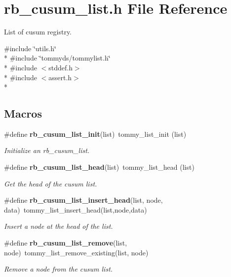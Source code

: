 \section{rb\+\_\+cusum\+\_\+list.\+h File Reference}
\label{rb__cusum__list_8h}


List of cusum registry.  


{\ttfamily \#include \char`\"{}utils.\+h\char`\"{}}\\*
{\ttfamily \#include \char`\"{}tommyds/tommylist.\+h\char`\"{}}\\*
{\ttfamily \#include $<$stddef.\+h$>$}\\*
{\ttfamily \#include $<$assert.\+h$>$}\\*
\subsection*{Macros}
\begin{DoxyCompactItemize}
\item 
\#define {\bf rb\+\_\+cusum\+\_\+list\+\_\+init}(list)~tommy\+\_\+list\+\_\+init (list)
\begin{DoxyCompactList}\small\item\em Initialize an rb\+\_\+cusum\+\_\+list. \end{DoxyCompactList}\item 
\#define {\bf rb\+\_\+cusum\+\_\+list\+\_\+head}(list)~tommy\+\_\+list\+\_\+head (list)
\begin{DoxyCompactList}\small\item\em Get the head of the cusum list. \end{DoxyCompactList}\item 
\#define {\bf rb\+\_\+cusum\+\_\+list\+\_\+insert\+\_\+head}(list, node, data)~tommy\+\_\+list\+\_\+insert\+\_\+head(list,node,data)
\begin{DoxyCompactList}\small\item\em Insert a node at the head of the list. \end{DoxyCompactList}\item 
\#define {\bf rb\+\_\+cusum\+\_\+list\+\_\+remove}(list, node)~tommy\+\_\+list\+\_\+remove\+\_\+existing(list, node)
\begin{DoxyCompactList}\small\item\em Remove a node from the cusum list. \end{DoxyCompactList}\end{DoxyCompactItemize}
